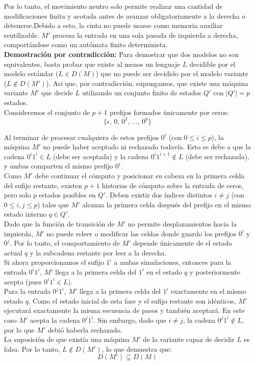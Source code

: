 Por lo tanto, el movimiento neutro solo permite realizar una cantidad de modificaciones finita y acotada antes de avanzar obligatoriamente a la derecha o detenerse.Debido a esto, la cinta no puede usarse como memoria auxiliar reutilizable. $M'$ procesa la entrada en una sola pasada de izquierda a derecha, comportándose como un autómata finito determinista.\\

\textbf{Demostración por contradicción:} Para demostrar que dos modelos no son equivalentes, basta probar que existe al menos un lenguaje $L$ decidible por el modelo estándar ($L \in D(M)$) que no puede ser decidido por el modelo variante ($L \notin D(M')$). Asi que, por contradicción, supongamos, que existe una máquina variante $M'$ que decide $L$ utilizando un conjunto finito de estados $Q'$ con $\vert{}Q'\vert{} = p$ estados.\\

Consideremos el conjunto de $p + 1$ prefijos formados únicamente por ceros:$$\{\epsilon, \, 0, \, 0^2, \, \dots, \, 0^p\}$$

Al terminar de procesar cualquiera de estos prefijos $0^i$ (con $0 \le i \le p$), la máquina $M'$ no puede haber aceptado ni rechazado todavía. Esto se debe a que la cadena $0^i 1^i \in L$ (debe ser aceptada) y la cadena $0^i 1^{i+1} \notin L$ (debe ser rechazada), y ambas comparten el mismo prefijo $0^i$.\\

Como $M'$ debe continuar el cómputo y posicionar su cabeza en la primera celda del sufijo restante, existen $p + 1$ historias de cómputo sobre la entrada de ceros, pero solo $p$ estados posibles en $Q'$. Deben existir dos índices distintos $i \neq j$ (con $0 \le i, j \le p$) tales que $M'$ alcanza la primera celda después del prefijo en el mismo estado interno $q \in Q'$.\\

Dado que la función de transición de $M'$ no permite desplazamientos hacia la izquierda, $M'$ no puede releer o modificar las celdas donde guardo los prefijos $0^i$ y $0^j$. Por lo tanto, el comportamiento de $M'$ depende únicamente de el estado actual $q$ y la subcadena restante por leer a la derecha.\\

Si ahora proporcionamos el sufijo $1^i$ a ambas simulaciones, entonces para la entrada $0^i 1^i$, $M'$ llega a la primera celda del $1^i$ en el estado $q$ y posteriormente acepta (pues $0^i 1^i \in L$).\\

Para la entrada $0^j 1^i$, $M'$ llega a la primera celda del $1^i$ exactamente en el mismo estado $q$. Como el estado inicial de esta fase y el sufijo restante son idénticos, $M'$ ejecutará exactamente la misma secuencia de pasos y también aceptará. En este caso $M'$ acepta la cadena $0^j 1^i$. Sin embargo, dado que $i \neq j$, la cadena $0^j 1^i \notin L$, por lo que $M'$ debió haberla rechazado.\\

La suposición de que existía una máquina $M'$ de la variante capaz de decidir $L$ es falsa. Por lo tanto, $L \notin D(M')$, lo que demuestra que:$$D(M') \subsetneq D(M)$$\cite{sipser2013introduction}
